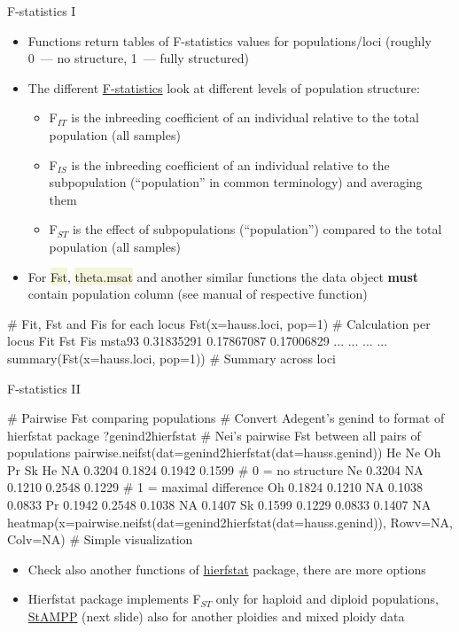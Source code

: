 \documentclass[compress, xelatex, 11pt, xcolor=svgnames, aspectratio=169,
	hyperref={
		bookmarks=true,
		unicode=true,
		colorlinks=true,
		pdftitle={Molecular data in R},
		plainpages=false,
		pdfauthor={Vojtech Zeisek},
		pdfsubject={Course about phylogeny and evolution in R},
		pdfcreator={XeLaTeX},
		pdfkeywords={R, evolution, phylogeny, molecular data},
		linkcolor=Crimson, %
		anchorcolor=Magenta, %
		citecolor=Magenta, %
		filecolor=Magenta, %
		menucolor=Magenta, %
		urlcolor=DodgerBlue, %
		},
	url={hyphens, lowtilde} %
	]{beamer}
\renewcommand{\texttt}[1]{\colorbox{Beige}{{\ttfamily #1}}}
\begin{document}
\begin{frame}[fragile]{F-statistics I}
	\begin{itemize}
		\item Functions return tables of F-statistics values for populations/loci (roughly 0~--- no structure, 1~--- fully structured)
		\item The different \href{https://en.wikipedia.org/wiki/F-statistics}{F-statistics} look at different levels of population structure:
		\begin{itemize}
			\item F$_{IT}$ is the inbreeding coefficient of an individual relative to the total population (all samples)
			\item F$_{IS}$ is the inbreeding coefficient of an individual relative to the subpopulation (\enquote{population} in common terminology) and averaging them
			\item F$_{ST}$ is the effect of subpopulations (\enquote{population}) compared to the total population (all samples)
		\end{itemize}
		\item For \texttt{Fst}, \texttt{theta.msat} and another similar functions the data object \textbf{must} contain population column (see manual of respective function)
	\end{itemize}
	\begin{spluscode}
    # Fit, Fst and Fis for each locus
    Fst(x=hauss.loci, pop=1) # Calculation per locus
                    Fit        Fst         Fis
    msta93   0.31835291 0.17867087  0.17006829
        ...         ...        ...         ...
    summary(Fst(x=hauss.loci, pop=1)) # Summary across loci
	\end{spluscode}
\end{frame}

\begin{frame}[fragile]{F-statistics II}
	\begin{spluscode}
    # Pairwise Fst comparing populations
    # Convert Adegent's genind to format of hierfstat package
    ?genind2hierfstat
    # Nei's pairwise Fst between all pairs of populations
    pairwise.neifst(dat=genind2hierfstat(dat=hauss.genind))
           He     Ne     Oh     Pr     Sk
    He     NA 0.3204 0.1824 0.1942 0.1599 # 0 = no structure
    Ne 0.3204     NA 0.1210 0.2548 0.1229 # 1 = maximal difference
    Oh 0.1824 0.1210     NA 0.1038 0.0833
    Pr 0.1942 0.2548 0.1038     NA 0.1407
    Sk 0.1599 0.1229 0.0833 0.1407     NA
    heatmap(x=pairwise.neifst(dat=genind2hierfstat(dat=hauss.genind)),
      Rowv=NA, Colv=NA) # Simple visualization
	\end{spluscode}
	\begin{itemize}
		\item Check also another functions of \href{https://CRAN.R-project.org/package=hierfstat}{hierfstat} package, there are more options
		\item Hierfstat package implements F$_{ST}$ only for haploid and diploid populations, \href{https://CRAN.R-project.org/package=StAMPP}{StAMPP} (next slide) also for another ploidies and mixed ploidy data
	\end{itemize}
\end{frame}
\end{document}

